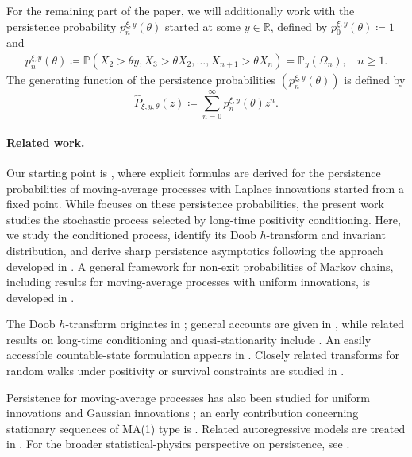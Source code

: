 \documentclass[10pt,a4paper]{amsart}
\newcommand{\R}{\mathbb{R}} %
\renewcommand{\P}{\mathbb{P}} %
\newcommand{\1}{\mathds{1}}
\begin{document}
For the remaining part of the paper, we will additionally work with the persistence probability $ p_n^{\xi,y}(\theta)$ started at some $y\in\R$, defined by $p_0^{\xi,y}(\theta)\coloneqq 1$ and
\begin{align*}
    p_n^{\xi,y}(\theta)\coloneqq \P(X_2>\theta y,X_3>\theta X_2,\dots,X_{n+1}>\theta X_{n})=\P_y(\Omega_n),~~~~n\ge 1.
\end{align*}
The generating function of the persistence probabilities  $(p_n^{\xi,y}(\theta))$ is defined by $$\hat{P}_{\xi,y,\theta}(z)\coloneqq \sum_{n=0}^\infty p_n^{\xi,y}(\theta)z^n.$$
\paragraph{Related work.}
Our starting point is \cite{AR}, where explicit formulas are derived for the persistence probabilities of moving-average processes with Laplace innovations started from a fixed point. While \cite{AR} focuses on these persistence probabilities, the present work studies the stochastic process selected by long-time positivity conditioning. Here, we study the conditioned process, identify its Doob $h$-transform and invariant distribution, and derive sharp persistence asymptotics following the approach developed in \cite{AW}. A general framework for non-exit probabilities of Markov chains, including results for moving-average processes with uniform innovations, is developed in \cite{AMZ}.

The Doob $h$-transform originates in \cite{doob}; general accounts are given in \cite{RogersWilliams1,RogersWilliams2}, while related results on long-time conditioning and quasi-stationarity include \cite{ChampagnatVillemonais2016,ColletMartinezSanMartin,SenetaVereJones}. An easily accessible countable-state formulation appears in \cite[Theorem 2.11]{Swart}. Closely related transforms for random walks under positivity or survival constraints are studied in \cite{BertoinDoney,Caravenna2005,CaravennaChaumont2008,CaravennaChaumont2013,Wachtel1,Wachtel4,Wachtel6,Wachtel7,Wachtel5,Wachtel2,Wachtel3,EichelsbacherKonig}.

Persistence for moving-average processes has also been studied for uniform innovations \cite{AurzadaRaschel} and Gaussian innovations \cite{2,12}; an early contribution concerning stationary sequences of MA(1) type is \cite{15}. Related autoregressive models are treated in \cite{1,3,5,9,DonnartSimon,11,14}. For the broader statistical-physics perspective on persistence, see \cite{8}.
\end{document}
